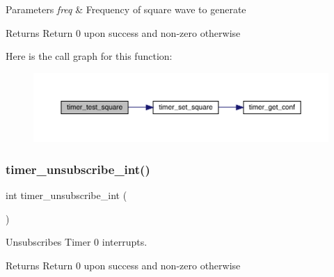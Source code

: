 \begin{DoxyParams}{Parameters}
{\em freq} & Frequency of square wave to generate \\
\hline
\end{DoxyParams}
\begin{DoxyReturn}{Returns}
Return 0 upon success and non-\/zero otherwise 
\end{DoxyReturn}
Here is the call graph for this function\+:\nopagebreak
\begin{figure}[H]
\begin{center}
\leavevmode
\includegraphics[width=350pt]{group__timer_ga2e596aede5a7bfc4a6f4382779bf0d7d_cgraph}
\end{center}
\end{figure}
\hypertarget{group__timer_gab9eea51549744bca5c5c923b388bb4ee}{}\label{group__timer_gab9eea51549744bca5c5c923b388bb4ee} 
\subsubsection{\texorpdfstring{timer\+\_\+unsubscribe\+\_\+int()}{timer\_unsubscribe\_int()}}
{\footnotesize\ttfamily int timer\+\_\+unsubscribe\+\_\+int (\begin{DoxyParamCaption}{ }\end{DoxyParamCaption})}



Unsubscribes Timer 0 interrupts. 

\begin{DoxyReturn}{Returns}
Return 0 upon success and non-\/zero otherwise 
\end{DoxyReturn}

